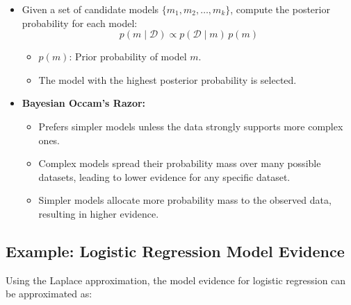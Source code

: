 \begin{itemize}
    \item Given a set of candidate models $\{m_1, m_2, \ldots, m_k\}$, compute the posterior probability for each model:
          \[
              p(m \mid \mathcal{D}) \propto p(\mathcal{D} \mid m) \, p(m)
          \]
          \begin{itemize}
              \item $p(m)$: Prior probability of model $m$.
              \item The model with the highest posterior probability is selected.
          \end{itemize}
    \item \textbf{Bayesian Occam's Razor:}
          \begin{itemize}
              \item Prefers simpler models unless the data strongly supports more complex ones.
              \item Complex models spread their probability mass over many possible datasets, leading to lower evidence for any specific dataset.
              \item Simpler models allocate more probability mass to the observed data, resulting in higher evidence.
          \end{itemize}
\end{itemize}

\subsection{Example: Logistic Regression Model Evidence}

Using the Laplace approximation, the model evidence for logistic regression can be approximated as:

